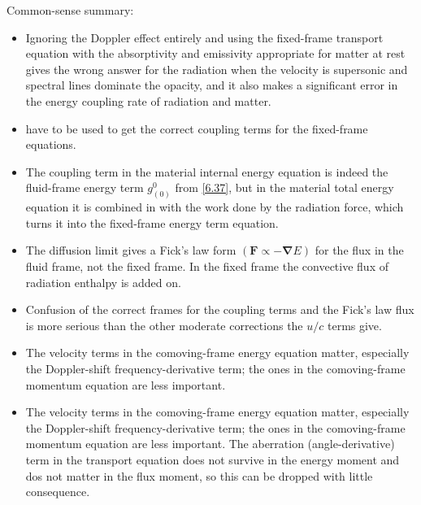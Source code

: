 \documentclass[letterpaper]{report}
\newcommand\bn{\boldsymbol{\nabla}}
\newcommand\bs{\boldsymbol}
\renewcommand{\(}{\left(}
\renewcommand{\)}{\right)}
\renewcommand{\[}{\left[}
\renewcommand{\]}{\right]}
\begin{document}
Common-sense summary:
\begin{itemize}
  \item Ignoring the Doppler effect entirely and using the fixed-frame
  transport equation with the absorptivity and emissivity appropriate for
  matter at rest gives the wrong answer for the radiation when the velocity is
  supersonic and spectral  lines dominate the opacity, and it also makes a
  significant error in the energy coupling rate of radiation and matter.
  \item {} have to be used to get the correct coupling terms for
  the fixed-frame equations.
  \item The coupling term in the material internal energy equation is indeed
  the fluid-frame energy term $g_{(0)}^0$ from \cref{6.37}, but in the
  material total energy equation it is combined in with the work done by the
  radiation force, which turns it into the fixed-frame energy term equation.
  \item The diffusion limit gives a Fick's law form $(\bs{F}\propto -\bn E)$
  for the flux in the fluid frame, not the fixed frame. In the fixed frame
  the convective flux of radiation enthalpy is added on.
  \item Confusion of the correct frames for the coupling terms and the Fick's
  law flux is more serious than the other moderate corrections the $u/c$ terms
  give.
  \item The velocity terms in the comoving-frame energy equation matter,
  especially the Doppler-shift frequency-derivative term; the ones in the
  comoving-frame momentum equation are less important.
  \item The velocity terms in the comoving-frame energy equation matter,
  especially the Doppler-shift frequency-derivative term; the ones in the
  comoving-frame momentum equation are less important. The aberration
  (angle-derivative) term in the transport equation does not survive in the
  energy moment and dos not matter in the flux moment, so this can be dropped
  with little consequence.
\end{itemize}
\end{document}
